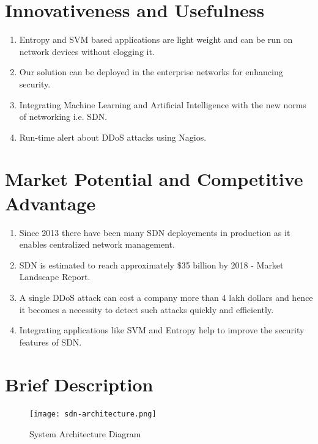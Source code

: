 \documentclass[12pt,a4paper,final]{article}
\begin{document}
\begin{flushleft}
\noindent
\section{Innovativeness and Usefulness}
\begin{enumerate}
\item
Entropy and SVM based applications are light weight and can be run on network devices without clogging it.

\item
Our solution can be deployed in the enterprise networks for enhancing security.

\item
Integrating Machine Learning and Artificial Intelligence with the new norms of networking i.e. SDN.

\item
Run-time alert about DDoS attacks using Nagios.
\end{enumerate}

\noindent
\section{Market Potential and Competitive Advantage}
\begin{enumerate}
\item
Since 2013 there have been many SDN deployements in production as it enables centralized network management.

\item
SDN is estimated to reach approximately \$35 billion by 2018 - Market Landscape Report.

\item
A single DDoS attack can cost a company more than 4 lakh dollars and hence it becomes a necessity to detect such attacks quickly and efficiently.

\item
Integrating applications like SVM and Entropy help to improve the security features of SDN.
\end{enumerate}

\noindent
\section{Brief Description}
\begin{figure}[H]
\begin{center}
\texttt{[image: sdn-architecture.png]}
\caption{System Architecture Diagram}
\end{center}
\end{figure}


\end{flushleft}
\end{document}
